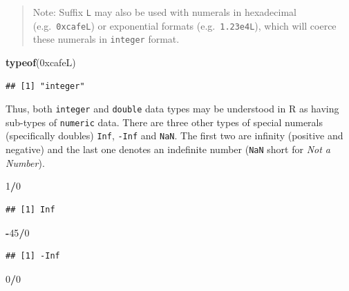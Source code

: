 \documentclass[
]{book}
\newenvironment{Shaded}{\begin{snugshade}}{\end{snugshade}}
\newcommand{\DecValTok}[1]{\textcolor[rgb]{0.00,0.00,0.81}{#1}}
\newcommand{\FunctionTok}[1]{\textcolor[rgb]{0.13,0.29,0.53}{\textbf{#1}}}
\newcommand{\NormalTok}[1]{#1}
\newcommand{\SpecialCharTok}[1]{\textcolor[rgb]{0.81,0.36,0.00}{\textbf{#1}}}
\begin{document}
\begin{quote}
Note: Suffix \texttt{L} may also be used with numerals in hexadecimal (e.g.~\texttt{0xcafeL}) or exponential formats (e.g.~\texttt{1.23e4L}), which will coerce these numerals in \texttt{integer} format.
\end{quote}

\begin{Shaded}
\begin{Highlighting}[]
\FunctionTok{typeof}\NormalTok{(0xcafeL)}
\end{Highlighting}
\end{Shaded}

\begin{verbatim}
## [1] "integer"
\end{verbatim}

Thus, both \texttt{integer} and \texttt{double} data types may be understood in R as having sub-types of \texttt{numeric} data. There are three other types of special numerals (specifically doubles) \texttt{Inf}, \texttt{-Inf} and \texttt{NaN}. The first two are infinity (positive and negative) and the last one denotes an indefinite number (\texttt{NaN} short for \emph{Not a Number}).

\begin{Shaded}
\begin{Highlighting}[]
\DecValTok{1}\SpecialCharTok{/}\DecValTok{0}
\end{Highlighting}
\end{Shaded}

\begin{verbatim}
## [1] Inf
\end{verbatim}

\begin{Shaded}
\begin{Highlighting}[]
\SpecialCharTok{{-}}\DecValTok{45}\SpecialCharTok{/}\DecValTok{0}
\end{Highlighting}
\end{Shaded}

\begin{verbatim}
## [1] -Inf
\end{verbatim}

\begin{Shaded}
\begin{Highlighting}[]
\DecValTok{0}\SpecialCharTok{/}\DecValTok{0}
\end{Highlighting}
\end{Shaded}
\end{document}

